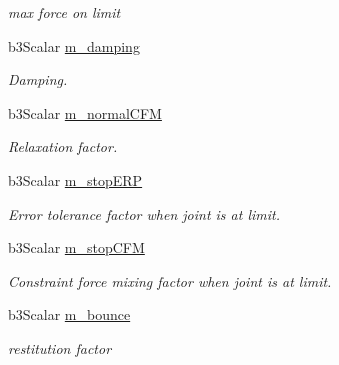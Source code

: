 \begin{Indent}{\bf }
\begin{CompactItemize}
\begin{CompactList}\small\item\em max force on limit \item\end{CompactList}\item 
\hypertarget{classb3_rotational_limit_motor_5422cfc344c2cbfa6d0c6bf9038b8cda}{
b3Scalar \hyperlink{classb3_rotational_limit_motor_5422cfc344c2cbfa6d0c6bf9038b8cda}{m\_\-damping}}
\label{classb3_rotational_limit_motor_5422cfc344c2cbfa6d0c6bf9038b8cda}

\begin{CompactList}\small\item\em Damping. \item\end{CompactList}\item 
b3Scalar \hyperlink{classb3_rotational_limit_motor_bf008f6f2ecc5a97eed73825db97678e}{m\_\-normalCFM}
\begin{CompactList}\small\item\em Relaxation factor. \item\end{CompactList}\item 
\hypertarget{classb3_rotational_limit_motor_df95422e97681f78a9318f0741a5dd3e}{
b3Scalar \hyperlink{classb3_rotational_limit_motor_df95422e97681f78a9318f0741a5dd3e}{m\_\-stopERP}}
\label{classb3_rotational_limit_motor_df95422e97681f78a9318f0741a5dd3e}

\begin{CompactList}\small\item\em Error tolerance factor when joint is at limit. \item\end{CompactList}\item 
\hypertarget{classb3_rotational_limit_motor_e6ca3aeedd5553952bdeb78fc6c0d80b}{
b3Scalar \hyperlink{classb3_rotational_limit_motor_e6ca3aeedd5553952bdeb78fc6c0d80b}{m\_\-stopCFM}}
\label{classb3_rotational_limit_motor_e6ca3aeedd5553952bdeb78fc6c0d80b}

\begin{CompactList}\small\item\em Constraint force mixing factor when joint is at limit. \item\end{CompactList}\item 
\hypertarget{classb3_rotational_limit_motor_ea0c46f6073f5a4866d0b548069736f4}{
b3Scalar \hyperlink{classb3_rotational_limit_motor_ea0c46f6073f5a4866d0b548069736f4}{m\_\-bounce}}
\label{classb3_rotational_limit_motor_ea0c46f6073f5a4866d0b548069736f4}

\begin{CompactList}\small\item\em restitution factor \item\end{CompactList}\end{CompactItemize}
\end{Indent}

